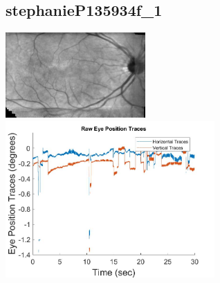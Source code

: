 \documentclass[11pt]{article}
\begin{document}
\subsection{stephanieP135934f\_1}
\includegraphics[width=0.40\textwidth, valign=m]{referenceframes/rodenstock_normal/stephanieP135934f_1_dwt_nostim_gamscaled_bandfilt_refframe.jpg}
\includegraphics[width=0.60\textwidth, valign=m]{eyepositiontraces/rodenstock_normal/stephanieP135934f_1.jpg}\\
\end{document}
